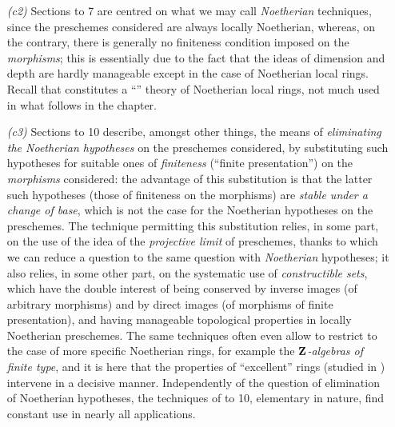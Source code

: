 \begin{enumerate}[label=\emph{(alph*)}]
\begin{enumerate}
        \item[\emph{(c2)}] Sections \textsection{} to 7 are centred on what we may call \emph{Noetherian} techniques, since the preschemes considered are always locally Noetherian, whereas, on the contrary, there is generally no finiteness condition imposed on the \emph{morphisms};
            this is essentially due to the fact that the ideas of dimension and depth are hardly manageable except in the case of Noetherian local rings.
            Recall that  constitutes a ``'' theory of Noetherian local rings, not much used in what follows in the chapter.
        \item[\emph{(c3)}] Sections \textsection{} to 10 describe, amongst other things, the means of \emph{eliminating the Noetherian hypotheses} on the preschemes considered, by substituting such hypotheses for suitable ones of \emph{finiteness} (``finite presentation'') on the \emph{morphisms} considered: the advantage of this substitution is that the latter such hypotheses (those of finiteness on the morphisms) are \emph{stable under a change of base}, which is not the case for the Noetherian hypotheses on the preschemes.
            The technique permitting this substitution relies, in some part, on the use of the idea of the \emph{projective limit} of preschemes, thanks to which we can reduce a question to the same question with \emph{Noetherian} hypotheses;
            it also relies, in some other part, on the systematic use of \emph{constructible sets}, which have the double interest of being conserved by inverse images (of arbitrary morphisms)
            and by direct images (of morphisms of finite presentation), and having manageable topological properties in locally Noetherian preschemes.
            The same techniques often even allow to restrict to the case of more specific Noetherian rings, for example the \emph{$\mathbf{Z}$-algebras of finite type}, and it is here that the properties of ``excellent'' rings (studied in ) intervene in a decisive manner.
            Independently of the question of elimination of Noetherian hypotheses, the techniques of \textsection{} to 10, elementary in nature, find constant use in nearly all applications.
    \end{enumerate}
\end{enumerate}


% 
% 
% 
% 
% 
% 
% 
% 
% 
% 
% 
% 
% 
% 
% 
% 
% 
% 
% 
% 






